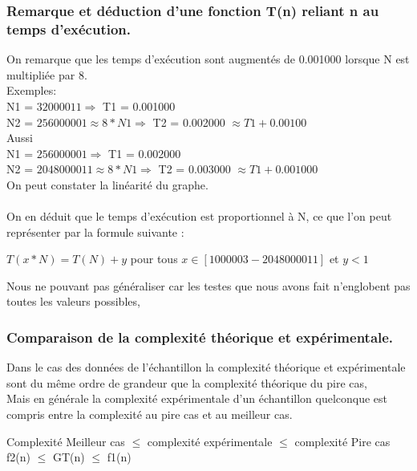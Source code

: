 \documentclass[12pt]{article}
\begin{document}
\subsubsection{Remarque et déduction d'une fonction T(n) reliant n au temps d'exécution.}


On remarque que les temps d'exécution sont augmentés de 0.001000 lorsque N est multipliée par 8.
\\

\color{blue}
Exemples:
\color{black} 
\\
N1 = $32000011  \Rightarrow  $  T1 = 0.001000
\\
N2 = $256000001 \approx 8 * N1  \Rightarrow  $  T2 = 0.002000 $\approx T1 + 0.00100 $
\\

Aussi
\\
N1 = $256000001 \Rightarrow $  T1 = 0.002000
\\
N2 = $2048000011 \approx 8 * N1 \Rightarrow $  T2 = 0.003000 $\approx T1 + 0.001000 $
\\

On peut constater la linéarité du graphe. 
\\
\\
On en déduit que le temps d'exécution est proportionnel à N, ce que l'on peut représenter par la formule suivante
: 
\begin{center}
\color{blue}
	$T(x*N) = T(N) + y $ pour tous $ x \in [1000003 - 2048000011]$ et $y < 1 $	
	
\color{black}

\end{center}

Nous ne pouvant pas généraliser car les testes que nous avons fait n'englobent pas toutes les valeurs possibles, 
	


\subsubsection{Comparaison de la complexité théorique et expérimentale. }

Dans le cas des données de l'échantillon la complexité théorique et expérimentale sont du même ordre de grandeur que la complexité théorique du pire cas,
\\
Mais en générale la complexité expérimentale d'un échantillon quelconque est compris entre la complexité au pire cas et au meilleur cas.
\\
\begin{center}
\color{blue}
Complexité Meilleur cas $\le$ complexité expérimentale $\le$ complexité Pire cas 
\\
f2(n) $\le$ GT(n) $\le$ f1(n)
\color{black}
\end{center}
\end{document}
